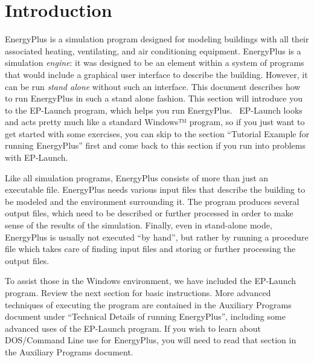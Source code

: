 \section{Introduction}\label{introduction}

EnergyPlus is a simulation program designed for modeling buildings with all their associated heating, ventilating, and air conditioning equipment. EnergyPlus is a simulation \emph{engine}: it was designed to be an element within a system of programs that would include a graphical user interface to describe the building. However, it can be run \emph{stand alone} without such an interface. This document describes how to run EnergyPlus in such a stand alone fashion. This section will introduce you to the EP-Launch program, which helps you run EnergyPlus.~ EP-Launch looks and acts pretty much like a standard Windows™ program, so if you just want to get started with some exercises, you can skip to the section ``Tutorial Example for running EnergyPlus'' first and come back to this section if you run into problems with EP-Launch.

Like all simulation programs, EnergyPlus consists of more than just an executable file. EnergyPlus needs various input files that describe the building to be modeled and the environment surrounding it. The program produces several output files, which need to be described or further processed in order to make sense of the results of the simulation. Finally, even in stand-alone mode, EnergyPlus is usually not executed ``by hand'', but rather by running a procedure file which takes care of finding input files and storing or further processing the output files.

To assist those in the Windows environment, we have included the EP-Launch program. Review the next section for basic instructions. More advanced techniques of executing the program are contained in the Auxiliary Programs document under ``Technical Details of running EnergyPlus'', including some advanced uses of the EP-Launch program. If you wish to learn about DOS/Command Line use for EnergyPlus, you will need to read that section in the Auxiliary Programs document.
